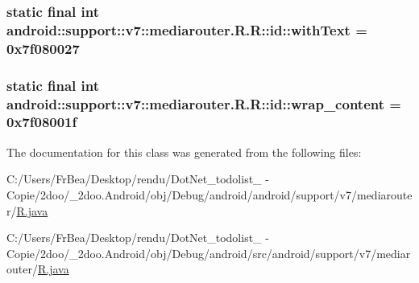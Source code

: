 \hypertarget{classandroid_1_1support_1_1v7_1_1mediarouter_1_1_r_1_1id_928f08c0b7ea90cd762590b4ab22684c}{
\subsubsection[{withText}]{\setlength{\rightskip}{0pt plus 5cm}static final int android::support::v7::mediarouter.R.R::id::withText = 0x7f080027}}
\label{classandroid_1_1support_1_1v7_1_1mediarouter_1_1_r_1_1id_928f08c0b7ea90cd762590b4ab22684c}


\hypertarget{classandroid_1_1support_1_1v7_1_1mediarouter_1_1_r_1_1id_07151c331c159cd99cd36e23483808ff}{
\subsubsection[{wrap\_\-content}]{\setlength{\rightskip}{0pt plus 5cm}static final int android::support::v7::mediarouter.R.R::id::wrap\_\-content = 0x7f08001f}}
\label{classandroid_1_1support_1_1v7_1_1mediarouter_1_1_r_1_1id_07151c331c159cd99cd36e23483808ff}




The documentation for this class was generated from the following files:\begin{CompactItemize}
\item 
C:/Users/FrBea/Desktop/rendu/DotNet\_\-todolist\_ - Copie/2doo/\_\-2doo.Android/obj/Debug/android/android/support/v7/mediarouter/\hyperlink{android_2support_2v7_2mediarouter_2_r_8java}{R.java}\item 
C:/Users/FrBea/Desktop/rendu/DotNet\_\-todolist\_ - Copie/2doo/\_\-2doo.Android/obj/Debug/android/src/android/support/v7/mediarouter/\hyperlink{src_2android_2support_2v7_2mediarouter_2_r_8java}{R.java}\end{CompactItemize}
